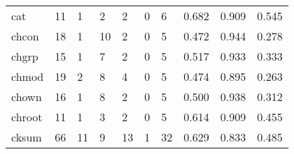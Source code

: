 \begin{longtable}{lp{2.0cm}p{2.0cm}p{2.0cm}p{2.0cm}p{2.0cm}p{2.0cm}p{2.0cm}p{2.0cm}p{2.0cm}}
cat       &                     11 &                                             1 &                                            2 &                                           2 &                                            0 &                                          6 &                                0.682 &                                  0.909 &                                0.545 \\
chcon     &                     18 &                                             1 &                                           10 &                                           2 &                                            0 &                                          5 &                                0.472 &                                  0.944 &                                0.278 \\
chgrp     &                     15 &                                             1 &                                            7 &                                           2 &                                            0 &                                          5 &                                0.517 &                                  0.933 &                                0.333 \\
chmod     &                     19 &                                             2 &                                            8 &                                           4 &                                            0 &                                          5 &                                0.474 &                                  0.895 &                                0.263 \\
chown     &                     16 &                                             1 &                                            8 &                                           2 &                                            0 &                                          5 &                                0.500 &                                  0.938 &                                0.312 \\
chroot    &                     11 &                                             1 &                                            3 &                                           2 &                                            0 &                                          5 &                                0.614 &                                  0.909 &                                0.455 \\
cksum     &                     66 &                                            11 &                                            9 &                                          13 &                                            1 &                                         32 &                                0.629 &                                  0.833 &                                0.485 \\

\end{longtable}
